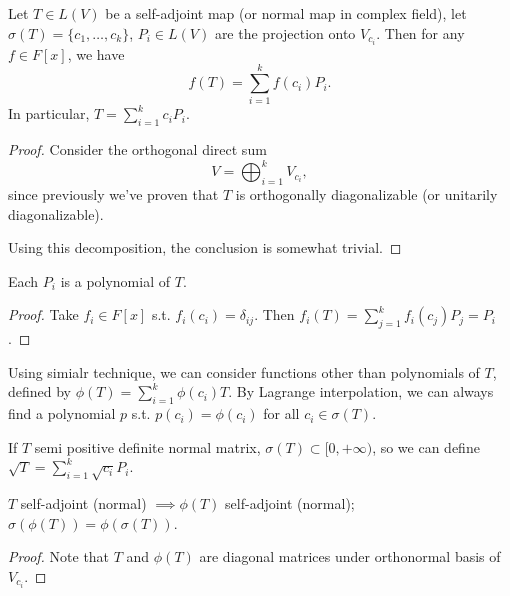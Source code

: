 \begin{theorem}
    Let $T\in L(V)$ be a self-adjoint map (or normal map in complex field),
	let $\sigma(T) = \{c_1,\dots, c_k\}$, $P_i\in L(V)$ are the projection
	onto $V_{c_i}$. Then for any $f\in F[x]$, we have
	\[
	f(T) = \sum_{i=1}^{k} f(c_i)P_i.
	\]
	In particular, $T = \sum_{i=1}^{k} c_iP_i$.
\end{theorem}
\begin{proof}[Proof]
    Consider the orthogonal direct sum
	\[
	V = \bigoplus_{i=1}^k V_{c_i},
	\]
	since previously we've proven that $T$ is orthogonally diagonalizable
	(or unitarily diagonalizable).

	Using this decomposition, the conclusion is somewhat trivial.
\end{proof}

\begin{corollary}
    Each $P_i$ is a polynomial of $T$.
\end{corollary}
\begin{proof}[Proof]
	Take $f_i\in F[x]$ s.t. $f_i(c_i) = \delta_{ij}$.
	Then $f_i(T) = \sum_{j=1}^{k} f_i(c_j)P_j = P_i$.
\end{proof}

Using simialr technique, we can consider functions other than polynomials of $T$,
defined by $\phi(T) = \sum_{i=1}^{k} \phi(c_i) T$.
By Lagrange interpolation, we can always find a polynomial $p$ s.t.
$p(c_i) = \phi(c_i)$ for all $c_i\in \sigma(T)$.

\begin{example}
	If $T$ semi positive definite normal matrix, $\sigma(T) \subset [0, +\infty)$,
	so we can define $\sqrt{T} = \sum_{i=1}^{k} \sqrt{c_i}P_i$.
\end{example}

\begin{proposition}
	$T$ self-adjoint (normal) $\implies \phi(T)$ self-adjoint (normal);
	$\sigma(\phi(T)) = \phi(\sigma(T))$.
\end{proposition}
\begin{proof}[Proof]
    Note that $T$ and $\phi(T)$ are diagonal matrices
	under orthonormal basis of $V_{c_i}$.
\end{proof}
